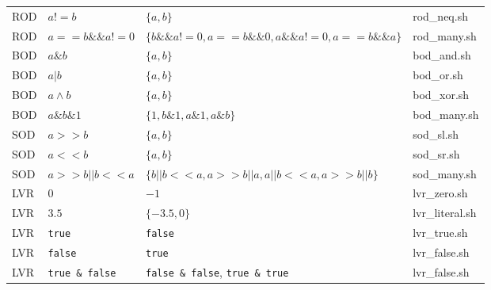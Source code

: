 \begin{table}[h]
\begin{tabular}{|llp{6cm}l|}
ROD	&	$a!=b$	&	$\{a, b\}$	&	rod\_neq.sh \\
ROD	&	$a == b \&\& a != 0$	&	$\{b \&\& a != 0, a == b \&\&  0, a  \&\& a != 0, a == b \&\& a\}$	&	rod\_many.sh \\
BOD	&	$a\&b$	&	$\{a, b\}$	&	bod\_and.sh \\
BOD	&	$a|b$	&	$\{a, b\}$	&	bod\_or.sh \\
BOD	&	$a \land b$	&	$\{a, b\}$	&	bod\_xor.sh \\
BOD	&	$a \& b \& 1$	&	$\{ 1, b \& 1, a \& 1, a \& b\}$	&	bod\_many.sh \\
SOD	&	$a>>b$	&	$\{a, b\}$	&	sod\_sl.sh \\
SOD	&	$a<<b$	&	$\{a, b\}$	&	sod\_sr.sh \\
SOD	&	$a >> b || b << a$	&	$\{b || b << a,a >> b || a, a || b << a, a >> b || b\}$	&	sod\_many.sh \\
LVR	&	$0$	&	$-1$	&	lvr\_zero.sh \\
LVR	&	$3.5$	&	$\{-3.5, 0\}$	&	lvr\_literal.sh \\
LVR	&	\texttt{true}	&	\texttt{false}	&	lvr\_true.sh \\
LVR	&	\texttt{false}	&	\texttt{true}	&	lvr\_false.sh \\
LVR	&	\texttt{true \& false}	&	\texttt{false \& false}, \texttt{true \& true}	&	lvr\_false.sh \\
\hline
\end{tabular}
\end{table}
